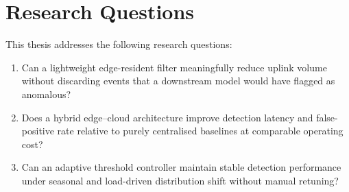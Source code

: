 \section{Research Questions}
This thesis addresses the following research questions:
\begin{enumerate}[label=\textbf{RQ\arabic*.}, leftmargin=2.1cm]
  \item Can a lightweight edge-resident filter meaningfully reduce uplink volume without
        discarding events that a downstream model would have flagged as anomalous?
  \item Does a hybrid edge--cloud architecture improve detection latency and false-positive
        rate relative to purely centralised baselines at comparable operating cost?
  \item Can an adaptive threshold controller maintain stable detection performance under
        seasonal and load-driven distribution shift without manual retuning?
\end{enumerate}
